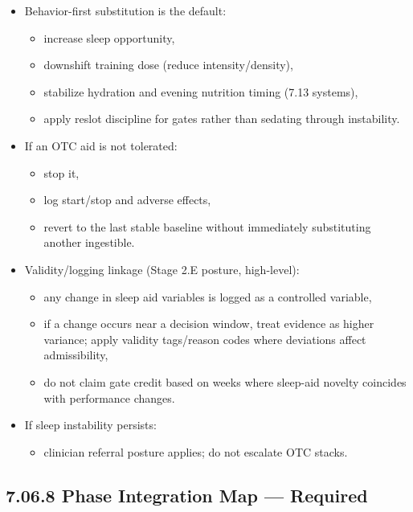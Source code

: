 \documentclass[10pt]{article}
\begin{document}
\begin{itemize}
\item Behavior-first substitution is the default:
  \begin{itemize}
  \item increase sleep opportunity,
  \item downshift training dose (reduce intensity/density),
  \item stabilize hydration and evening nutrition timing (7.13 systems),
  \item apply reslot discipline for gates rather than sedating through instability.
  \end{itemize}
\item If an OTC aid is not tolerated:
  \begin{itemize}
  \item stop it,
  \item log start/stop and adverse effects,
  \item revert to the last stable baseline without immediately substituting another ingestible.
  \end{itemize}
\item Validity/logging linkage (Stage 2.E posture, high-level):
  \begin{itemize}
  \item any change in sleep aid variables is logged as a controlled variable,
  \item if a change occurs near a decision window, treat evidence as higher variance; apply validity tags/reason codes where deviations affect admissibility,
  \item do not claim gate credit based on weeks where sleep-aid novelty coincides with performance changes.
  \end{itemize}
\item If sleep instability persists:
  \begin{itemize}
  \item clinician referral posture applies; do not escalate OTC stacks.
  \end{itemize}
\end{itemize}

\subsection*{7.06.8 Phase Integration Map — Required}
{}

\begingroup
\scriptsize
\setlength{\tabcolsep}{2pt}
\renewcommand{\arraystretch}{1.12}
\end{document}
